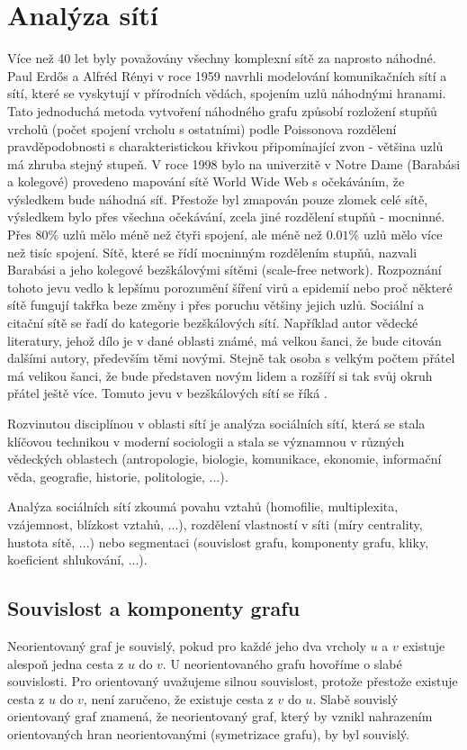 \documentclass{bakalarka}
\begin{document}
\chapter{Analýza sítí}
Více než 40 let byly považovány všechny komplexní sítě za naprosto náhodné.
Paul Erdős a Alfréd Rényi v roce 1959 navrhli modelování komunikačních sítí a
sítí, které se vyskytují v přírodních vědách, spojením uzlů náhodnými hranami.
Tato jednoduchá metoda vytvoření náhodného grafu způsobí rozložení stupňů
vrcholů (počet spojení vrcholu s ostatními) podle Poissonova rozdělení
pravděpodobnosti s charakteristickou křivkou připomínající zvon - většina uzlů
má zhruba stejný stupeň. 
V roce 1998 bylo na univerzitě v Notre Dame (Barabási a kolegové) provedeno
mapování sítě World Wide Web s očekáváním, že výsledkem bude náhodná síť.
Přestože byl zmapován pouze zlomek celé sítě, výsledkem bylo přes všechna
očekávání, zcela jiné rozdělení stupňů - mocninné. Přes $80\%$ uzlů mělo méně
než čtyři spojení, ale méně než $0.01\%$ uzlů mělo více než tisíc spojení.
Sítě, které se řídí mocninným rozdělením stupňů, nazvali Barabási a jeho kolegové
bezškálovými sítěmi (scale-free network). Rozpoznání tohoto jevu vedlo k
lepšímu porozumění šíření virů a epidemií nebo proč některé sítě fungují takřka
beze změny i přes poruchu většiny jejich uzlů.  Sociální a citační sítě se řadí
do kategorie bezškálových sítí. Například autor vědecké literatury, jehož dílo
je v dané oblasti známé, má velkou šanci, že bude citován dalšími autory,
především těmi novými. Stejně tak osoba s velkým počtem přátel má velikou
šanci, že bude představen novým lidem a rozšíří si tak svůj okruh přátel ještě
více. Tomuto jevu v bezškálových sítí se říká .

Rozvinutou disciplínou v oblasti sítí je analýza sociálních sítí, která se
stala klíčovou technikou v moderní sociologii a stala se významnou v různých
vědeckých oblastech (antropologie, biologie, komunikace, ekonomie, informační
věda, geografie, historie, politologie, ...).

Analýza sociálních sítí zkoumá povahu vztahů (homofilie, multiplexita,
vzájemnost, blízkost vztahů, ...), rozdělení vlastností v síti (míry
centrality, hustota sítě, ...) nebo segmentaci (souvislost grafu, komponenty
grafu, kliky, koeficient shlukování, ...).

\section{Souvislost a komponenty grafu}
Neorientovaný graf je souvislý, pokud pro každé jeho dva vrcholy $u$ a $v$
existuje alespoň jedna cesta z $u$ do $v$. U neorientovaného grafu hovoříme o
slabé souvislosti. Pro orientovaný uvažujeme silnou souvislost, protože
přestože existuje cesta z $u$ do $v$, není zaručeno, že existuje cesta z $v$ do
$u$.  Slabě souvislý orientovaný graf znamená, že neorientovaný graf, který by
vznikl nahrazením orientovaných hran neorientovanými (symetrizace grafu), by
byl souvislý.
\end{document}
